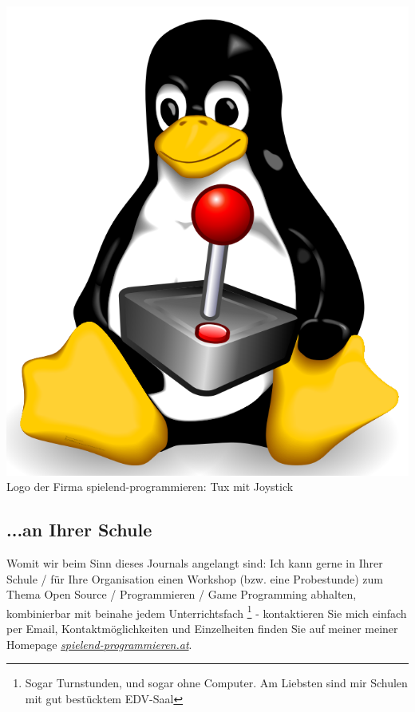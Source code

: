 \begin{center}
\includegraphics[width=0.5\linewidth]{editorial/editorial-tuxstick3.png}\\
\footnotesize{Logo der Firma spielend-programmieren: Tux mit Joystick}
\end{center}

\subsection*{...an Ihrer Schule}
Womit wir beim Sinn dieses Journals angelangt sind: Ich kann gerne in Ihrer Schule / für Ihre Organisation einen Workshop (bzw. eine Probestunde) zum Thema Open Source / Programmieren / Game Programming abhalten, kombinierbar mit beinahe jedem Unterrichtsfach \footnote{Sogar Turnstunden, und sogar ohne Computer. Am Liebsten sind mir Schulen mit gut bestücktem EDV-Saal} - kontaktieren Sie mich einfach per Email, Kontaktmöglichkeiten und Einzelheiten finden Sie auf meiner  meiner Homepage \href{http://spielend-programmieren.at}{\textit{spielend-programmieren.at}}.


